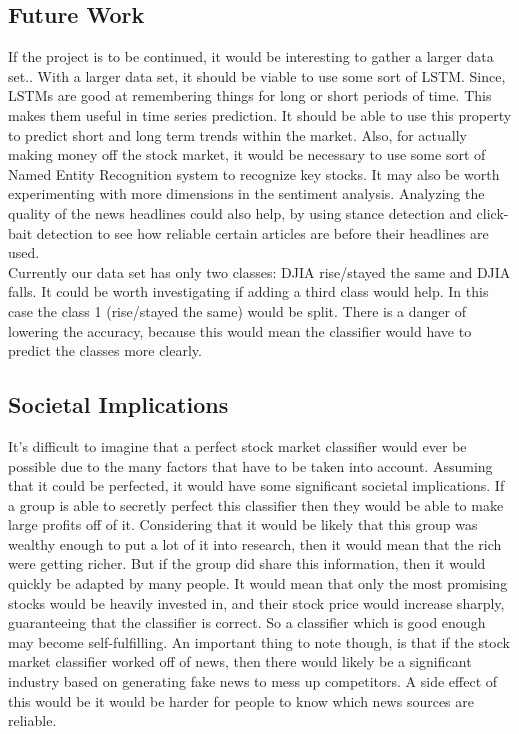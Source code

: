 \documentclass[11pt,a4paper]{article}
\begin{document}
\subsection{Future Work}
If the project is to be continued, it would be interesting to gather a larger data set.. With a larger data set, it should be viable to use some sort of LSTM. Since, LSTMs are good at remembering things for long or short periods of time. This makes them useful in time series prediction. It should be able to use this property to predict short and long term trends within the market. Also, for actually making money off the stock market, it would be necessary to use some sort of Named Entity Recognition system to recognize key stocks. It may also be worth experimenting with more dimensions in the sentiment analysis. Analyzing the quality of the news headlines could also help, by using stance detection and click-bait detection to see how reliable certain articles are before their headlines are used.\\

Currently our data set has only two classes: DJIA rise/stayed the same and DJIA falls. It could be worth investigating if adding a third class would help. In this case the class 1 (rise/stayed the same) would be split. There is a danger of lowering the accuracy, because this would mean the classifier would have to predict the classes more clearly.

\subsection{Societal Implications}
It's difficult to imagine that a perfect stock market classifier would ever be possible due to the many factors that have to be taken into account. Assuming that it could be perfected, it would have some significant societal implications. If a group is able to secretly perfect this classifier  then they would be able to make large profits off of it. Considering that it would be likely that this group was wealthy enough to put a lot of it into research, then it would mean that the rich were getting richer. But if the group did share this information, then it would quickly be adapted by many people. It would mean that only the most promising stocks would be heavily invested in, and their stock price would increase sharply,  guaranteeing that the classifier is correct. So a classifier which is good enough may become self-fulfilling. An important thing to note though, is that if the stock market classifier worked off of news, then there would likely be a significant industry based on generating fake news to mess up competitors. A side effect of this would be it would be harder for people to know which news sources are reliable.
\end{document}
